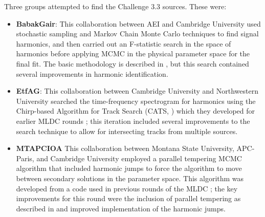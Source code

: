 \documentclass{iopart}
\begin{document}
Three groups attempted to find the Challenge 3.3 sources.  These were:
\begin{itemize}
\item \textbf{BabakGair}: This collaboration between AEI and Cambridge University used stochastic sampling and Markov Chain Monte Carlo techniques to find signal harmonics, and then carried out an F-statistic search in the space of harmonics before applying MCMC in the physical parameter space for the final fit.  The basic methodology is described in \cite{BabakGairPorter}, but this search contained several improvements in harmonic identification.
\item \textbf{EtfAG}: This collaboration between Cambridge University and Northwestern University searched the time-frequency spectrogram for harmonics using the Chirp-based Algorithm for Track Search (CATS, \cite{CATS}) which they developed for earlier MLDC rounds \cite{GairMandelWen}; this iteration included several improvements to the search technique to allow for intersecting tracks from multiple sources.
\item \textbf{MTAPCIOA} This collaboration between Montana State University, APC-Paris, and Cambridge University employed a parallel tempering MCMC algorithm that included harmonic jumps to force the algorithm to move between secondary solutions in the parameter space. This algorithm was developed from a code used in previous rounds of the MLDC \cite{Cornish:2008}; the key improvements for this round were the inclusion of parallel tempering as described in \cite{keycornish} and improved implementation of the harmonic jumps.
\end{itemize}
\end{document}
